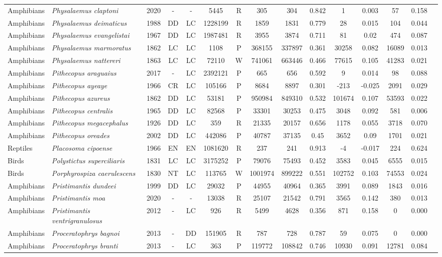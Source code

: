 \documentclass[12pt,openright,oneside,a4paper,english]{abntex2}
\begin{document}
\begin{landscape}
\begin{longtable}{llccccccccccccc}
		Amphibians&\textit{Physalaemus claptoni}&2020&-&-&5445&R&305&304&0.842&1&0.003&57&0.158\\
		Amphibians&\textit{Physalaemus deimaticus}&1988&DD&LC&1228199&R&1859&1831&0.779&28&0.015&104&0.044\\
		Amphibians&\textit{Physalaemus evangelistai}&1967&DD&LC&1987481&R&3955&3874&0.711&81&0.02&474&0.087\\
		Amphibians&\textit{Physalaemus marmoratus}&1862&LC&LC&1108&P&368155&337897&0.361&30258&0.082&16089&0.013\\
		Amphibians&\textit{Physalaemus nattereri}&1863&LC&LC&72110&W&741061&663446&0.466&77615&0.105&41283&0.021\\
		Amphibians&\textit{Pithecopus araguaius}&2017&-&LC&2392121&P&665&656&0.592&9&0.014&98&0.088\\
		Amphibians&\textit{Pithecopus ayeaye}&1966&CR&LC&105166&P&8684&8897&0.301&-213&-0.025&2091&0.029\\
		Amphibians&\textit{Pithecopus azureus}&1862&DD&LC&53181&P&950984&849310&0.532&101674&0.107&53593&0.022\\
		Amphibians&\textit{Pithecopus centralis}&1965&DD&LC&82568&P&33301&30253&0.475&3048&0.092&581&0.006\\
		Amphibians&\textit{Pithecopus megacephalus}&1926&DD&LC&359&R&21335&20157&0.656&1178&0.055&3718&0.070\\
		Amphibians&\textit{Pithecopus oreades}&2002&DD&LC&442086&P&40787&37135&0.45&3652&0.09&1701&0.021\\
		Reptiles&\textit{Placosoma cipoense}&1966&EN&EN&1081620&R&237&241&0.913&-4&-0.017&224&0.624\\
		Birds&\textit{Polystictus superciliaris}&1831&LC&LC&3175252&P&79076&75493&0.452&3583&0.045&6555&0.015\\
		Birds&\textit{Porphyrospiza caerulescens}&1830&NT&LC&113765&W&1001974&899222&0.551&102752&0.103&74553&0.024\\
		Amphibians&\textit{Pristimantis dundeei}&1999&DD&LC&29032&P&44955&40964&0.365&3991&0.089&1843&0.016\\
		Amphibians&\textit{Pristimantis moa}&2020&-&-&13038&R&25107&21542&0.791&3565&0.142&380&0.013\\
		Amphibians&\textit{Pristimantis ventrigranulosus}&2012&-&LC&926&R&5499&4628&0.356&871&0.158&0&0.000\\
		Amphibians&\textit{Proceratophrys bagnoi}&2013&-&DD&151905&R&787&728&0.787&59&0.075&0&0.000\\
		Amphibians&\textit{Proceratophrys branti}&2013&-&LC&363&P&119772&108842&0.746&10930&0.091&12781&0.084\\

\end{longtable}
\end{landscape}
\end{document}
